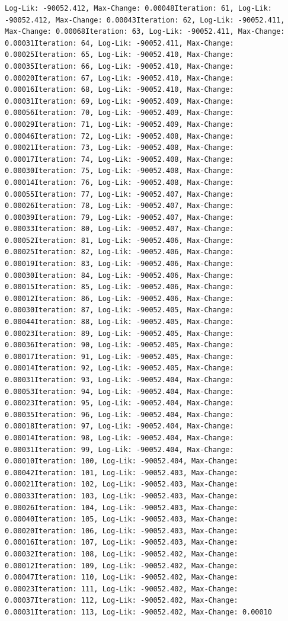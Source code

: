 \documentclass[
  english,
  man,floatsintext]{apa6}
\begin{document}
\begin{verbatim}
Log-Lik: -90052.412, Max-Change: 0.00048Iteration: 61, Log-Lik: -90052.412, Max-Change: 0.00043Iteration: 62, Log-Lik: -90052.411, Max-Change: 0.00068Iteration: 63, Log-Lik: -90052.411, Max-Change: 0.00031Iteration: 64, Log-Lik: -90052.411, Max-Change: 0.00025Iteration: 65, Log-Lik: -90052.410, Max-Change: 0.00035Iteration: 66, Log-Lik: -90052.410, Max-Change: 0.00020Iteration: 67, Log-Lik: -90052.410, Max-Change: 0.00016Iteration: 68, Log-Lik: -90052.410, Max-Change: 0.00031Iteration: 69, Log-Lik: -90052.409, Max-Change: 0.00056Iteration: 70, Log-Lik: -90052.409, Max-Change: 0.00029Iteration: 71, Log-Lik: -90052.409, Max-Change: 0.00046Iteration: 72, Log-Lik: -90052.408, Max-Change: 0.00021Iteration: 73, Log-Lik: -90052.408, Max-Change: 0.00017Iteration: 74, Log-Lik: -90052.408, Max-Change: 0.00030Iteration: 75, Log-Lik: -90052.408, Max-Change: 0.00014Iteration: 76, Log-Lik: -90052.408, Max-Change: 0.00055Iteration: 77, Log-Lik: -90052.407, Max-Change: 0.00026Iteration: 78, Log-Lik: -90052.407, Max-Change: 0.00039Iteration: 79, Log-Lik: -90052.407, Max-Change: 0.00033Iteration: 80, Log-Lik: -90052.407, Max-Change: 0.00052Iteration: 81, Log-Lik: -90052.406, Max-Change: 0.00025Iteration: 82, Log-Lik: -90052.406, Max-Change: 0.00019Iteration: 83, Log-Lik: -90052.406, Max-Change: 0.00030Iteration: 84, Log-Lik: -90052.406, Max-Change: 0.00015Iteration: 85, Log-Lik: -90052.406, Max-Change: 0.00012Iteration: 86, Log-Lik: -90052.406, Max-Change: 0.00030Iteration: 87, Log-Lik: -90052.405, Max-Change: 0.00044Iteration: 88, Log-Lik: -90052.405, Max-Change: 0.00023Iteration: 89, Log-Lik: -90052.405, Max-Change: 0.00036Iteration: 90, Log-Lik: -90052.405, Max-Change: 0.00017Iteration: 91, Log-Lik: -90052.405, Max-Change: 0.00014Iteration: 92, Log-Lik: -90052.405, Max-Change: 0.00031Iteration: 93, Log-Lik: -90052.404, Max-Change: 0.00053Iteration: 94, Log-Lik: -90052.404, Max-Change: 0.00023Iteration: 95, Log-Lik: -90052.404, Max-Change: 0.00035Iteration: 96, Log-Lik: -90052.404, Max-Change: 0.00018Iteration: 97, Log-Lik: -90052.404, Max-Change: 0.00014Iteration: 98, Log-Lik: -90052.404, Max-Change: 0.00031Iteration: 99, Log-Lik: -90052.404, Max-Change: 0.00010Iteration: 100, Log-Lik: -90052.404, Max-Change: 0.00042Iteration: 101, Log-Lik: -90052.403, Max-Change: 0.00021Iteration: 102, Log-Lik: -90052.403, Max-Change: 0.00033Iteration: 103, Log-Lik: -90052.403, Max-Change: 0.00026Iteration: 104, Log-Lik: -90052.403, Max-Change: 0.00040Iteration: 105, Log-Lik: -90052.403, Max-Change: 0.00020Iteration: 106, Log-Lik: -90052.403, Max-Change: 0.00016Iteration: 107, Log-Lik: -90052.403, Max-Change: 0.00032Iteration: 108, Log-Lik: -90052.402, Max-Change: 0.00012Iteration: 109, Log-Lik: -90052.402, Max-Change: 0.00047Iteration: 110, Log-Lik: -90052.402, Max-Change: 0.00023Iteration: 111, Log-Lik: -90052.402, Max-Change: 0.00037Iteration: 112, Log-Lik: -90052.402, Max-Change: 0.00031Iteration: 113, Log-Lik: -90052.402, Max-Change: 0.00010
\end{verbatim}
\end{document}
